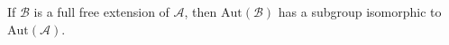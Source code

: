 If $\mathcal{B}$ is a full free extension of $\mathcal{A}$, then $\mathrm{Aut}(\mathcal{B})$ has a subgroup isomorphic to $\mathrm{Aut}(\mathcal{A})$.
